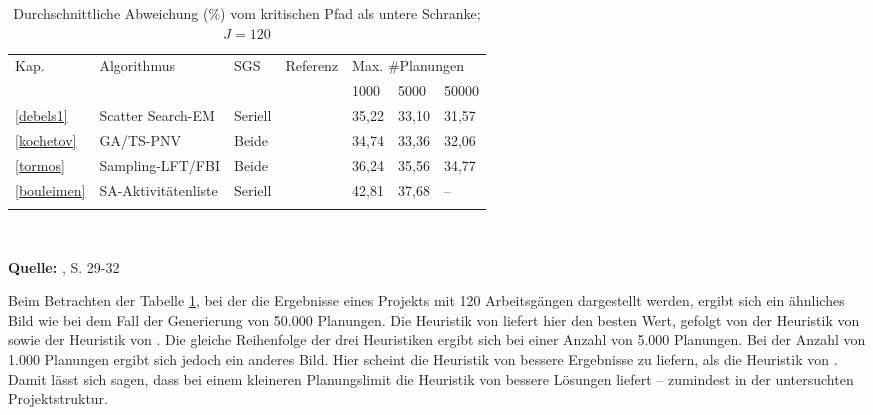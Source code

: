 \documentclass[a4paper,12pt,normalheadings,footexclude,headinclude,liststotoc,nochapterprefix,onecolumn,oneside,parskip,pointlessnumbers]{scrreprt}
\begin{document}
\begin{table}[h!]
  \begin{center}
    \caption{Durchschnittliche Abweichung (\%) vom kritischen Pfad als untere Schranke; $J=120$}  
    \begin{small} 
    \label{Tabelle3}
    \vspace*{3mm}
    \begin{tabular}{lllllll}   %
    Kap. & Algorithmus					& SGS		& Referenz	& \multicolumn{3}{l}{Max. \#Planungen}\\ 
        &   						&                	&           		& 1000	& 5000 & 50000	   \\ \hline
\ref{debels1}&		Scatter Search-EM & Seriell                &      \citeauthor{debels2006hybrid}     	& 35,22	& 33,10 & 31,57	   \\
\ref{kochetov}&	GA/TS-PNV & Beide                &      \citeauthor{kochetov2003evolutionary}     	& 34,74	& 33,36 & 32,06	   \\
\ref{tormos}&		Sampling-LFT/FBI & Beide                &      \citeauthor{tormos2003efficient}     	& 36,24	& 35,56 & 34,77	   \\
\ref{bouleimen}&			SA-Aktivitätenliste & Seriell                &      \citeauthor{bouleimen2003new}     	& 42,81 	& 37,68 & --	   \\
			\\ 
    \end{tabular} \\[3mm]
  \end{small} 
    {\footnotesize \textbf{Quelle:} \cite{kolisch2006experimental}, S. 29-32}   
  \end{center}
\end{table}

Beim Betrachten der Tabelle \ref{Tabelle3}, bei der die Ergebnisse eines Projekts mit 120 Arbeitsgängen dargestellt werden, ergibt sich ein ähnliches Bild wie bei dem Fall der Generierung von 50.000 Planungen. Die Heuristik von \cite{debels2006hybrid} liefert hier den besten Wert, gefolgt von der Heuristik von \cite{kochetov2003evolutionary} sowie der Heuristik von \cite{tormos2003efficient}. Die gleiche Reihenfolge der drei Heuristiken ergibt sich bei einer Anzahl von 5.000 Planungen. Bei der Anzahl von 1.000 Planungen ergibt sich jedoch ein anderes Bild. Hier scheint die Heuristik von \cite{kochetov2003evolutionary} bessere Ergebnisse zu liefern, als die Heuristik von \cite{debels2006hybrid}. Damit lässt sich sagen, dass bei einem kleineren Planungslimit die Heuristik von \cite{kochetov2003evolutionary} bessere Lösungen liefert -- zumindest in der untersuchten Projektstruktur.
\end{document}
